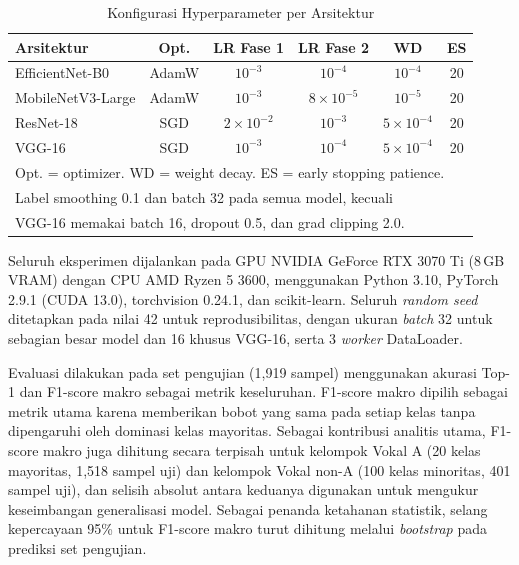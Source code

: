 \documentclass[conference]{IEEEtran}
\begin{document}
\begin{table}[t]
\caption{Konfigurasi Hyperparameter per Arsitektur}
\label{tab:hyperparam}
\begin{center}
\renewcommand{\arraystretch}{1.2}
\begin{tabular}{lccccc}
\toprule
\textbf{Arsitektur} & \textbf{Opt.} & \textbf{LR Fase 1} & \textbf{LR Fase 2}
  & \textbf{WD} & \textbf{ES} \\
\midrule
EfficientNet-B0    & AdamW & $10^{-3}$          & $10^{-4}$          & $10^{-4}$ & 20 \\
MobileNetV3-Large  & AdamW & $10^{-3}$          & $8{\times}10^{-5}$ & $10^{-5}$ & 20 \\
ResNet-18          & SGD   & $2{\times}10^{-2}$ & $10^{-3}$          & $5{\times}10^{-4}$ & 20 \\
VGG-16             & SGD   & $10^{-3}$          & $10^{-4}$          & $5{\times}10^{-4}$ & 20 \\
\bottomrule
\multicolumn{6}{l}{\footnotesize Opt. = optimizer. WD = weight decay. ES = early stopping patience.} \\
\multicolumn{6}{l}{\footnotesize Label smoothing 0.1 dan batch 32 pada semua model, kecuali} \\
\multicolumn{6}{l}{\footnotesize VGG-16 memakai batch 16, dropout 0.5, dan grad clipping 2.0.}
\end{tabular}
\end{center}
\end{table}

Seluruh eksperimen dijalankan pada GPU NVIDIA GeForce RTX 3070 Ti
(8\,GB VRAM) dengan CPU AMD Ryzen 5 3600, menggunakan Python 3.10,
PyTorch 2.9.1 (CUDA 13.0), torchvision 0.24.1, dan scikit-learn.
Seluruh \textit{random seed} ditetapkan pada nilai 42 untuk
reprodusibilitas, dengan ukuran \textit{batch} 32 untuk sebagian
besar model dan 16 khusus VGG-16, serta 3 \textit{worker} DataLoader.

Evaluasi dilakukan pada set pengujian (1,919 sampel) menggunakan
akurasi Top-1 dan F1-score makro sebagai metrik keseluruhan.
F1-score makro dipilih sebagai metrik utama karena memberikan
bobot yang sama pada setiap kelas tanpa dipengaruhi oleh dominasi
kelas mayoritas.
Sebagai kontribusi analitis utama, F1-score makro juga dihitung
secara terpisah untuk kelompok Vokal A (20 kelas mayoritas,
1,518 sampel uji) dan kelompok Vokal non-A (100 kelas
minoritas, 401 sampel uji), dan selisih absolut antara keduanya
digunakan untuk mengukur keseimbangan generalisasi model.
Sebagai penanda ketahanan statistik, selang kepercayaan 95\% untuk
F1-score makro turut dihitung melalui \textit{bootstrap} pada
prediksi set pengujian.
\end{document}
